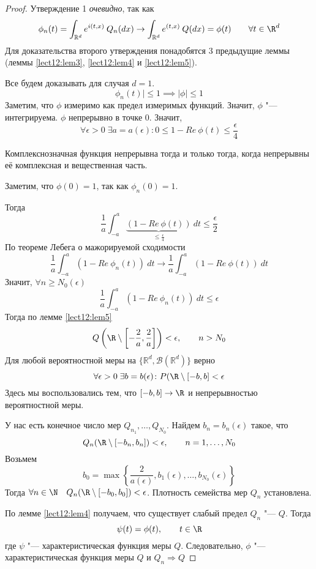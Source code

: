 \documentclass[a4paper,reqno]{amsart}
\begin{document}
\begin{proof}
    Утверждение 1 \emph{очевидно}, так как
    $$\phi_n(t) = \int_{\mathbb{R}^d} e^{i(t, x)} \:Q_n(dx) \to \int_{\mathbb{R}^d} e^{(t, x)}\: Q(dx) = \phi(t)\qquad \forall t \in \R^d$$
    Для доказательства второго утверждения понадобятся 3 предыдущие леммы (леммы \ref{lect12:lem3}, \ref{lect12:lem4} и \ref{lect12:lem5}). 

    Все будем доказывать для случая $d=1$.
$$\phi_n(t)| \leqslant 1 \implies |\phi| \leqslant 1 $$
Заметим, что $\phi$ измеримо как предел измеримых функций. Значит, $\phi$ "--- интегрируема.
    $\phi$ непрерывно в точке $0$. Значит,
    $$\forall \epsilon > 0 \; \exists a = a(\epsilon)\colon 0 \leqslant 1 - Re\: \phi(t) \leqslant \frac{\epsilon}{4}$$
    \begin{nb}
        Комплекснозначная функция непрерывна тогда и только тогда, когда непрерывны её комплексная и вещественная часть.
    \end{nb}
    Заметим, что $\phi(0) = 1$, так как $\phi_n(0) = 1$.

    Тогда
    $$\frac{1}{a} \int_{-a}^a \underbrace{(1 - Re\:\phi(t))}_{\leqslant \frac{\epsilon}{4} }\:dt \leqslant \frac{\epsilon}{2} $$
    По теореме Лебега о мажорируемой сходимости
    $$\frac{1}{a} \int_{-a}^a (1 - Re\:\phi_n(t))\:dt \to \frac{1}{a} \int_{-a}^a (1 - Re\:\phi(t))\:dt$$
    Значит, $\forall n \geqslant N_0(\epsilon)$
    $$\frac{1}{a} \int_{-a}^a (1 - Re\:\phi_n(t))\:dt \leqslant \epsilon$$
    Тогда по лемме \ref{lect12:lem5}
    $$Q\left(\R\setminus \left[-\frac{2}{a}, \frac{2}{a}\right]\right) < \epsilon, \qquad n > N_0$$
Для любой вероятностной меры на $\{\mathbb{R}^d, \mathcal{B}(\mathbb{R}^d)\}$ верно
$$\forall \epsilon > 0 \; \exists b = b(\epsilon)\colon P(\R\setminus[-b, b] < \epsilon$$
Здесь мы воспользовались тем, что $[-b, b] \to \R$ и непрерывностью вероятностной меры.

У нас есть конечное число мер $Q_{n_1}, \ldots, Q_{N_0}$. Найдем $b_n = b_n(\epsilon)$ такое, что
$$Q_n(\R\setminus[-b_n, b_n]) < \epsilon, \qquad n = 1,\ldots,N_0$$
Возьмем
$$b_0 = \max{\left\{\frac{2}{a(\epsilon)}, b_1(\epsilon), \ldots, b_{N_0}(\epsilon) \right\}}$$
Тогда $\forall n \in \N\quad Q_n(\R\setminus [-b_0, b_0]) < \epsilon$. Плотность семейства мер $Q_n$ установлена.

По лемме \ref{lect12:lem4} получаем, что существует слабый предел $Q_n$ "--- $Q$. Тогда
$$\psi(t) = \phi(t), \qquad t \in \R$$
где $\psi$ "--- характеристическая функция меры $Q$.
Следовательно, $\phi$ "--- характеристическая функция меры $Q$ и $Q_n \Rightarrow Q$
\end{proof}
\end{document}
